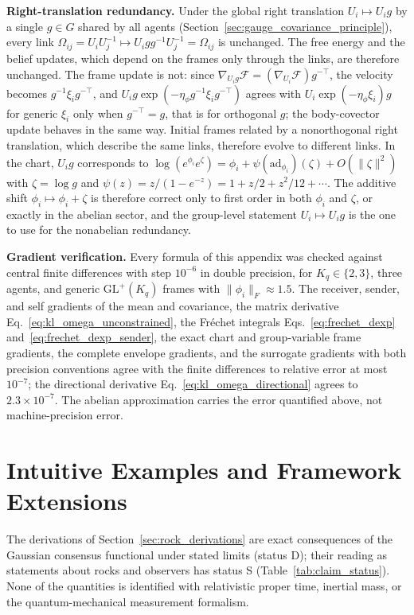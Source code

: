 \documentclass[11pt]{article}
\begin{document}
\textbf{Right-translation redundancy.} Under the global right translation $U_i \mapsto U_i g$ by a single $g \in G$ shared by all agents (Section~\ref{sec:gauge_covariance_principle}), every link $\Omega_{ij} = U_iU_j^{-1} \mapsto U_i g g^{-1} U_j^{-1} = \Omega_{ij}$ is unchanged. The free energy and the belief updates, which depend on the frames only through the links, are therefore unchanged. The frame update is not: since $\nabla_{U_ig}\mathcal{F} = (\nabla_{U_i}\mathcal{F})g^{-\top}$, the velocity becomes $g^{-1}\xi_i g^{-\top}$, and $U_ig\exp(-\eta_\phi g^{-1}\xi_ig^{-\top})$ agrees with $U_i\exp(-\eta_\phi\xi_i)g$ for generic $\xi_i$ only when $g^{-\top} = g$, that is for orthogonal $g$; the body-covector update behaves in the same way. Initial frames related by a nonorthogonal right translation, which describe the same links, therefore evolve to different links. In the chart, $U_ig$ corresponds to $\log(e^{\phi_i}e^{\zeta}) = \phi_i + \psi(\mathrm{ad}_{\phi_i})(\zeta) + O(\|\zeta\|^2)$ with $\zeta = \log g$ and $\psi(z) = z/(1 - e^{-z}) = 1 + z/2 + z^2/12 + \cdots$. The additive shift $\phi_i \mapsto \phi_i + \zeta$ is therefore correct only to first order in both $\phi_i$ and $\zeta$, or exactly in the abelian sector, and the group-level statement $U_i \mapsto U_i g$ is the one to use for the nonabelian redundancy.

\textbf{Gradient verification.} Every formula of this appendix was checked against central finite differences with step $10^{-6}$ in double precision, for $K_q \in \{2, 3\}$, three agents, and generic $\mathrm{GL}^+(K_q)$ frames with $\|\phi_i\|_F \approx 1.5$. The receiver, sender, and self gradients of the mean and covariance, the matrix derivative Eq.~\eqref{eq:kl_omega_unconstrained}, the Fr\'echet integrals Eqs.~\eqref{eq:frechet_dexp} and~\eqref{eq:frechet_dexp_sender}, the exact chart and group-variable frame gradients, the complete envelope gradients, and the surrogate gradients with both precision conventions agree with the finite differences to relative error at most $10^{-7}$; the directional derivative Eq.~\eqref{eq:kl_omega_directional} agrees to $2.3 \times 10^{-7}$. The abelian approximation carries the error quantified above, not machine-precision error.

\section{Intuitive Examples and Framework Extensions}
\label{app:examples}

The derivations of Section~\ref{sec:rock_derivations} are exact consequences of the Gaussian consensus functional under stated limits (status D); their reading as statements about rocks and observers has status S (Table~\ref{tab:claim_status}). None of the quantities is identified with relativistic proper time, inertial mass, or the quantum-mechanical measurement formalism.
\end{document}
